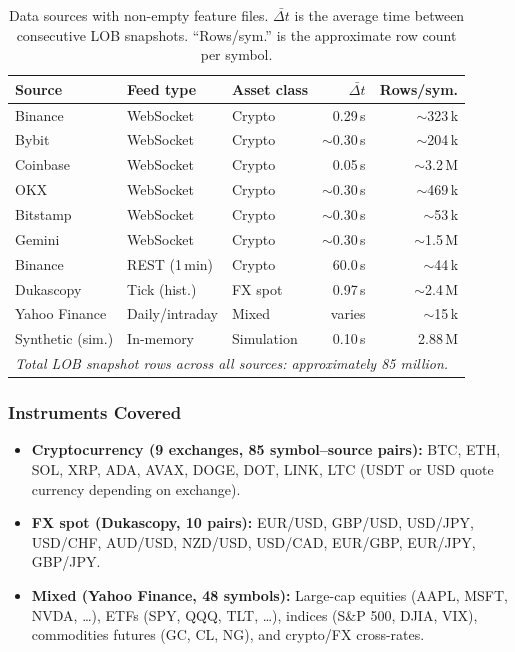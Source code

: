 \documentclass[12pt,a4paper]{article}
\theoremstyle{definition}
\theoremstyle{remark}
\begin{document}
\begin{table}[H]
\centering
\caption{Data sources with non-empty feature files. $\bar{\Delta t}$ is
the average time between consecutive LOB snapshots. ``Rows/sym.''
is the approximate row count per symbol.}
\label{tab:datasources}
\small
\setlength{\tabcolsep}{5pt}
\begin{tabular}{lllrr}
\toprule
\textbf{Source} & \textbf{Feed type} & \textbf{Asset class}
  & $\bar{\Delta t}$ & \textbf{Rows/sym.} \\
\midrule
Binance         & WebSocket   & Crypto    & 0.29\,s   & $\sim$323\,k \\
Bybit           & WebSocket   & Crypto    & $\sim$0.30\,s & $\sim$204\,k \\
Coinbase        & WebSocket   & Crypto    & 0.05\,s   & $\sim$3.2\,M \\
OKX             & WebSocket   & Crypto    & $\sim$0.30\,s & $\sim$469\,k \\
Bitstamp        & WebSocket   & Crypto    & $\sim$0.30\,s & $\sim$53\,k \\
Gemini          & WebSocket   & Crypto    & $\sim$0.30\,s & $\sim$1.5\,M \\
Binance         & REST (1\,min) & Crypto  & 60.0\,s   & $\sim$44\,k \\
Dukascopy       & Tick (hist.) & FX spot  & 0.97\,s   & $\sim$2.4\,M \\
Yahoo Finance   & Daily/intraday & Mixed  & varies    & $\sim$15\,k \\
Synthetic (sim.)& In-memory   & Simulation & 0.10\,s & 2.88\,M \\
\bottomrule
\multicolumn{5}{l}{\small\itshape Total LOB snapshot rows across all
  sources: approximately 85 million.}
\end{tabular}
\end{table}

\subsubsection{Instruments Covered}

\begin{itemize}
  \item \textbf{Cryptocurrency (9 exchanges, 85 symbol--source pairs):}
    BTC, ETH, SOL, XRP, ADA, AVAX, DOGE, DOT, LINK, LTC (USDT or
    USD quote currency depending on exchange).
  \item \textbf{FX spot (Dukascopy, 10 pairs):} EUR/USD, GBP/USD,
    USD/JPY, USD/CHF, AUD/USD, NZD/USD, USD/CAD, EUR/GBP, EUR/JPY,
    GBP/JPY.
  \item \textbf{Mixed (Yahoo Finance, 48 symbols):} Large-cap equities
    (AAPL, MSFT, NVDA, \ldots), ETFs (SPY, QQQ, TLT, \ldots),
    indices (S\&P 500, DJIA, VIX), commodities futures (GC, CL, NG),
    and crypto/FX cross-rates.
\end{itemize}
\end{document}
